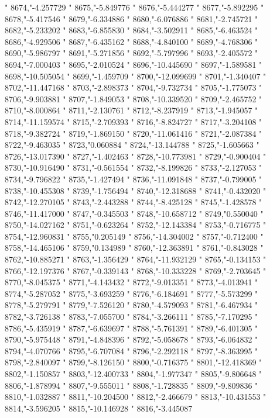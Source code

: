 "
8674,"-4.257729
"
8675,"-5.849776
"
8676,"-5.444277
"
8677,"-5.892295
"
8678,"-5.417546
"
8679,"-6.334886
"
8680,"-6.076886
"
8681,"-2.745721
"
8682,"-5.233202
"
8683,"-6.855830
"
8684,"-3.502911
"
8685,"-6.463524
"
8686,"-4.929506
"
8687,"-6.435162
"
8688,"-4.840100
"
8689,"-4.768306
"
8690,"-5.986797
"
8691,"-5.271856
"
8692,"-5.797996
"
8693,"-2.405572
"
8694,"-7.000403
"
8695,"-2.010524
"
8696,"-10.445690
"
8697,"-1.589581
"
8698,"-10.505054
"
8699,"-1.459709
"
8700,"-12.099699
"
8701,"-1.340407
"
8702,"-11.447168
"
8703,"-2.898373
"
8704,"-9.732734
"
8705,"-1.775073
"
8706,"-9.903881
"
8707,"-1.849053
"
8708,"-10.339520
"
8709,"-2.465752
"
8710,"-8.000864
"
8711,"-2.130761
"
8712,"-8.237919
"
8713,"-1.945057
"
8714,"-11.159574
"
8715,"-2.709393
"
8716,"-8.824727
"
8717,"-3.204108
"
8718,"-9.382724
"
8719,"-1.869150
"
8720,"-11.061416
"
8721,"-2.087384
"
8722,"-9.463035
"
8723,"0.060884
"
8724,"-13.144788
"
8725,"-1.605663
"
8726,"-13.017390
"
8727,"-1.402463
"
8728,"-10.773981
"
8729,"-0.900404
"
8730,"-10.916490
"
8731,"-0.561554
"
8732,"-8.199826
"
8733,"-2.127053
"
8734,"-9.796822
"
8735,"-1.427494
"
8736,"-11.091848
"
8737,"-0.799005
"
8738,"-10.455308
"
8739,"-1.756494
"
8740,"-12.318688
"
8741,"-0.432020
"
8742,"-12.270105
"
8743,"-2.443288
"
8744,"-8.425128
"
8745,"-1.428578
"
8746,"-11.417000
"
8747,"-0.345503
"
8748,"-10.658712
"
8749,"0.550040
"
8750,"-14.027162
"
8751,"-0.623264
"
8752,"-12.143384
"
8753,"-0.716775
"
8754,"-12.960831
"
8755,"0.205149
"
8756,"-14.304002
"
8757,"-0.712400
"
8758,"-14.465106
"
8759,"0.134989
"
8760,"-12.363891
"
8761,"-0.843028
"
8762,"-10.885271
"
8763,"-1.356429
"
8764,"-11.932129
"
8765,"-0.134153
"
8766,"-12.197376
"
8767,"-0.339143
"
8768,"-10.333228
"
8769,"-2.703645
"
8770,"-8.045375
"
8771,"-4.143432
"
8772,"-9.013351
"
8773,"-4.013941
"
8774,"-5.287052
"
8775,"-3.693259
"
8776,"-6.184691
"
8777,"-5.573299
"
8778,"-5.279791
"
8779,"-7.526120
"
8780,"-4.579093
"
8781,"-6.467934
"
8782,"-3.726138
"
8783,"-7.055700
"
8784,"-3.266111
"
8785,"-7.170295
"
8786,"-5.435919
"
8787,"-6.639697
"
8788,"-5.761391
"
8789,"-6.401305
"
8790,"-5.975448
"
8791,"-4.848396
"
8792,"-5.058678
"
8793,"-6.064832
"
8794,"-4.070766
"
8795,"-6.707084
"
8796,"-2.292118
"
8797,"-8.363995
"
8798,"-2.840097
"
8799,"-8.126150
"
8800,"-0.716375
"
8801,"-12.418369
"
8802,"-1.150857
"
8803,"-12.400733
"
8804,"-1.977347
"
8805,"-9.806648
"
8806,"-1.878994
"
8807,"-9.555011
"
8808,"-1.728835
"
8809,"-9.809836
"
8810,"-1.032887
"
8811,"-10.204500
"
8812,"-2.466679
"
8813,"-10.431553
"
8814,"-3.596205
"
8815,"-10.146928
"
8816,"-3.445087
